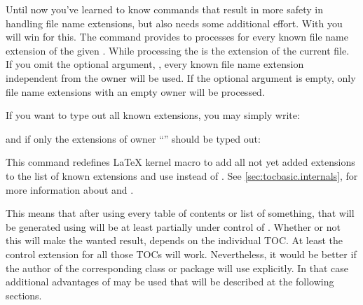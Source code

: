 \begin{Declaration}
\end{Declaration}
Until now you've learned to know commands that result in more safety in
handling file name extensions, but also needs some additional effort. With
 you will win for this. The command provides to
processes  for every known file name extension of the
given .  While processing the 
 is the extension of the current file.  If you omit the
optional argument, , every known file name extension
independent from the owner will be used. If the optional argument is empty,
only file name extensions with an empty owner will be processed.
\begin{Example}
  If you want to type out all known extensions, you may simply write:
\begin{lstcode}
  \doforeachtocfile{\typeout{\@currext}}
\end{lstcode}
  and if only the extensions of owner ``'' should be typed out:
\begin{lstcode}
  \doforeachtocfile[foo]{\typeout{\@currext}}
\end{lstcode}
\end{Example}
\EndIndexGroup


\begin{Declaration}
\end{Declaration}
This command redefines \LaTeX{} kernel macro  to add all not
yet added extensions to the list of known extensions and use
 instead of . See
\autoref{sec:tocbasic.internals},
 for more information about
 and .

This means that after using  every table of contents
or list of something, that will be generated using  will be
at least partially under control of . Whether or not this
will make the wanted result, depends on the individual TOC. At least the
 control extension for all those TOCs will work. Nevertheless,
it would be better if the author of the corresponding class or package will
use  explicitly. In that case additional advantages of
 may be used that will be described at the following
sections.%
\EndIndexGroup


